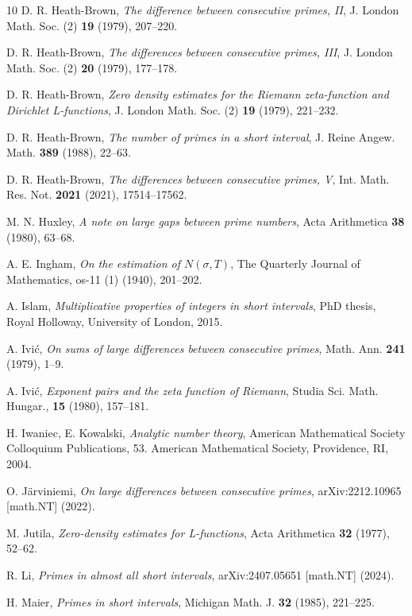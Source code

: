 \documentclass[12pt]{amsart}
\begin{document}
\begin{thebibliography}{10}
D. R. Heath-Brown, \emph{The difference between consecutive primes, II}, J. London Math. Soc. (2) \textbf{19} (1979), 207--220.

D. R. Heath-Brown, \emph{The differences between consecutive primes, III}, J. London Math. Soc. (2) \textbf{20} (1979), 177--178.

D. R. Heath-Brown, \emph{Zero density estimates for the Riemann zeta-function and Dirichlet L-functions}, J. London Math. Soc. (2) \textbf{19} (1979), 221--232.

D. R. Heath-Brown, \emph{The number of primes in a short interval}, J. Reine Angew. Math. \textbf{389} (1988), 22--63.

D. R. Heath-Brown, \emph{The differences between consecutive primes, V}, Int. Math. Res. Not. \textbf{2021} (2021), 17514--17562.

M. N. Huxley, \emph{A note on large gaps between prime numbers}, Acta Arithmetica \textbf{38} (1980), 63--68.

A. E. Ingham, \emph{On the estimation of $N(\sigma,T)$}, The Quarterly Journal of Mathematics, os-11 (1) (1940), 201--202.

A. Islam, \emph{Multiplicative properties of integers in short intervals}, PhD thesis, Royal Holloway, University of London, 2015.

A. Ivi\'c, \emph{On sums of large differences between consecutive primes}, Math. Ann. \textbf{241} (1979), 1--9.

A. Ivi\'c, \emph{Exponent pairs and the zeta function of Riemann}, Studia Sci. Math. Hungar., \textbf{15} (1980), 157--181.

H. Iwaniec, E. Kowalski, \emph{Analytic number theory}, American Mathematical Society Colloquium Publications, 53. American Mathematical Society, Providence, RI, 2004.

O. J\"arviniemi, \emph{On large differences between consecutive primes}, arXiv:2212.10965 [math.NT] (2022).

M. Jutila, \emph{Zero-density estimates for L-functions}, Acta Arithmetica \textbf{32} (1977), 52--62.

R. Li, \emph{Primes in almost all short intervals}, arXiv:2407.05651 [math.NT] (2024).

H. Maier, \emph{Primes in short intervals}, Michigan Math. J. \textbf{32} (1985), 221--225.


\end{thebibliography}
\end{document}
